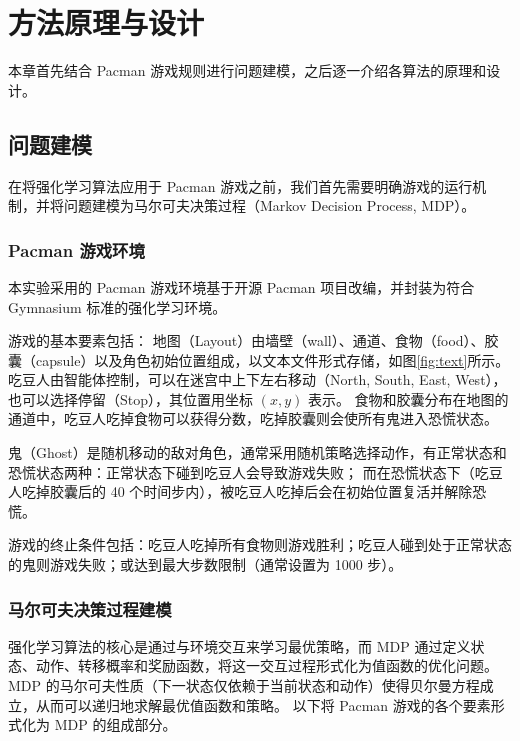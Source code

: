 \section{方法原理与设计}

本章首先结合 Pacman 游戏规则进行问题建模，之后逐一介绍各算法的原理和设计。

\subsection{问题建模}

在将强化学习算法应用于 Pacman 游戏之前，我们首先需要明确游戏的运行机制，并将问题建模为马尔可夫决策过程（Markov Decision Process, MDP）。

\subsubsection{Pacman 游戏环境}

本实验采用的 Pacman 游戏环境基于开源 Pacman 项目改编，并封装为符合 Gymnasium 标准的强化学习环境。


游戏的基本要素包括：
地图（Layout）由墙壁（wall）、通道、食物（food）、胶囊（capsule）以及角色初始位置组成，以文本文件形式存储，如图\ref{fig:text}所示。
吃豆人由智能体控制，可以在迷宫中上下左右移动（North, South, East, West），也可以选择停留（Stop），其位置用坐标 $(x, y)$ 表示。
食物和胶囊分布在地图的通道中，吃豆人吃掉食物可以获得分数，吃掉胶囊则会使所有鬼进入恐慌状态。


鬼（Ghost）是随机移动的敌对角色，通常采用随机策略选择动作，有正常状态和恐慌状态两种：正常状态下碰到吃豆人会导致游戏失败；
而在恐慌状态下（吃豆人吃掉胶囊后的 40 个时间步内），被吃豆人吃掉后会在初始位置复活并解除恐慌。


游戏的终止条件包括：吃豆人吃掉所有食物则游戏胜利；吃豆人碰到处于正常状态的鬼则游戏失败；或达到最大步数限制（通常设置为 1000 步）。


\subsubsection{马尔可夫决策过程建模}

强化学习算法的核心是通过与环境交互来学习最优策略，而 MDP 通过定义状态、动作、转移概率和奖励函数，将这一交互过程形式化为值函数的优化问题。
MDP 的马尔可夫性质（下一状态仅依赖于当前状态和动作）使得贝尔曼方程成立，从而可以递归地求解最优值函数和策略。
以下将 Pacman 游戏的各个要素形式化为 MDP 的组成部分。

